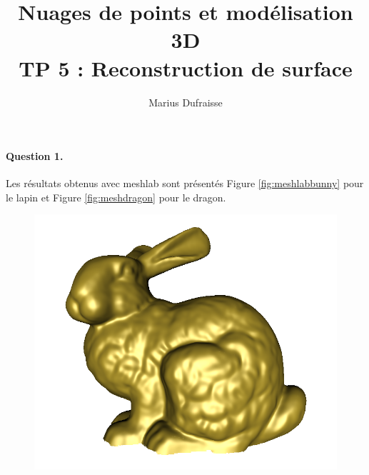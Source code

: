 \documentclass[french]{article}
\begin{document}
\title{Nuages de points et modélisation 3D\\
TP 5 : Reconstruction de surface}
\author{Marius Dufraisse}
\date{}

\maketitle

\paragraph{Question 1.} Les résultats obtenus avec meshlab sont présentés Figure \ref{fig:meshlabbunny} pour le lapin et Figure \ref{fig:meshdragon} pour le dragon.




\begin{figure}[h]
	\centering
	\begin{minipage}{0.47\linewidth}
		\centering
		\includegraphics[width=\linewidth]{bunnyrimls01.png}
	\end{minipage}\hfill
	\begin{minipage}{0.47\linewidth}
		\centering

\end{minipage}
\end{figure}
\end{document}
